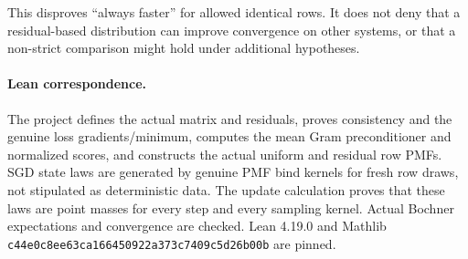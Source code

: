 \documentclass[11pt]{article}
\begin{document}
This disproves ``always faster'' for allowed identical rows. It does not deny that a residual-based distribution can improve convergence on other systems, or that a non-strict comparison might hold under additional hypotheses.

\paragraph{Lean correspondence.}
The project defines the actual matrix and residuals, proves consistency and the genuine loss gradients/minimum, computes the mean Gram preconditioner and normalized scores, and constructs the actual uniform and residual row PMFs. SGD state laws are generated by genuine PMF bind kernels for fresh row draws, not stipulated as deterministic data. The update calculation proves that these laws are point masses for every step and every sampling kernel. Actual Bochner expectations and convergence are checked. Lean 4.19.0 and Mathlib \texttt{c44e0c8ee63ca166450922a373c7409c5d26b00b} are pinned.
\end{document}
